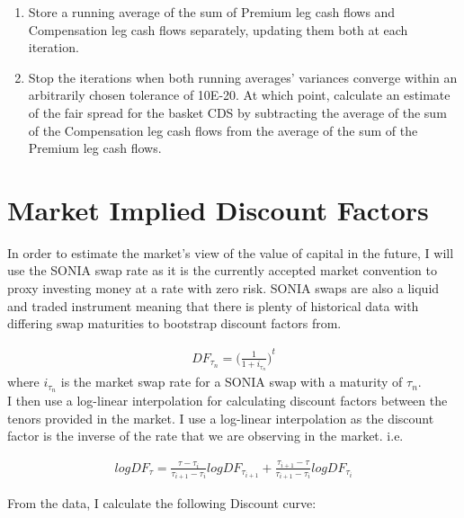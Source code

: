 \documentclass{report}
\theoremstyle{plain}
\theoremstyle{definition}
\begin{document}
\begin{enumerate}
\begin{enumerate}
		\item Store a running average of the sum of Premium leg cash flows and Compensation leg cash flows separately, updating them both at each iteration.
		\item Stop the iterations when both running averages' variances converge within an arbitrarily chosen tolerance of 10E-20. At which point, calculate an estimate of the fair spread for the basket CDS by subtracting the average of the sum of the Compensation leg cash flows from the average of the sum of the Premium leg cash flows.
	\end{enumerate}
\end{enumerate}



\chapter{Market Implied Discount Factors}

In order to estimate the market's view of the value of capital in the future, I will use the SONIA swap rate as it is the currently accepted market convention to proxy investing money at a rate with zero risk. SONIA swaps are also a liquid and traded instrument meaning that there is plenty of historical data with differing swap maturities to bootstrap discount factors from.

\begin{align*}
DF_{\tau_n} = {\Big(\frac{1}{1+i_{\tau_n}}\Big)}^{t}
\end{align*}
where $i_{\tau_n}$ is the market swap rate for a SONIA swap with a maturity of $\tau_n$.\\

I then use a log-linear interpolation for calculating discount factors between the tenors provided in the market. I use a log-linear interpolation as the discount factor is the inverse of the rate that we are observing in the market. i.e.

\begin{align*}
logDF_{\tau} = \frac{\tau - \tau_i}{\tau_{i+1} - \tau_{i}}logDF_{\tau_{i+1}} + \frac{\tau_{i+1} - \tau}{\tau_{i+1} - \tau_{i}}logDF_{\tau_{i}}
\end{align*}

From the data, I calculate the following Discount curve:
\end{document}
